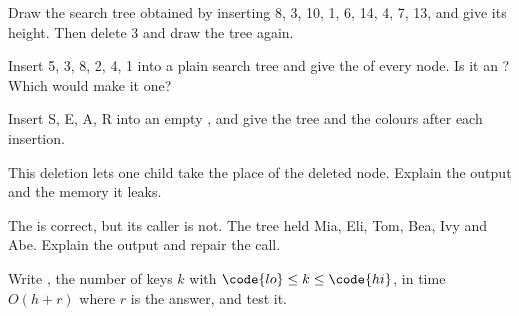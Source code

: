 \begin{exercise}[$\star$]\label{exo:b1:balanced-trees:2}
Draw the search tree obtained by inserting 8, 3, 10, 1, 6, 14, 4, 7, 13, and give its height. Then delete 3 and draw the
tree again.
\end{exercise}

\begin{exercise}[$\star$]\label{exo:b1:balanced-trees:3}
Insert 5, 3, 8, 2, 4, 1 into a plain search tree and give the  of every node. Is it an ? Which
 would make it one?
\end{exercise}

\begin{exercise}[$\star$]\label{exo:b1:balanced-trees:4}
Insert S, E, A, R into an empty , and give the tree and the colours after each insertion.
\end{exercise}

\begin{exercise}[$\star\star$]\label{exo:b1:balanced-trees:5}
This deletion lets one child take the place of the deleted node. Explain the output and the memory it leaks.
\end{exercise}

\begin{exercise}[$\star\star$]\label{exo:b1:balanced-trees:6}
The  is correct, but its caller is not. The tree held Mia, Eli, Tom, Bea, Ivy and Abe. Explain the output and
repair the call.
\end{exercise}

\begin{exercise}[$\star\star$]\label{exo:b1:balanced-trees:7}
Write , the number of keys $k$ with $\code{lo} \leq k \leq \code{hi}$, in time $O(h + r)$
where $r$ is the answer, and test it.
\end{exercise}

